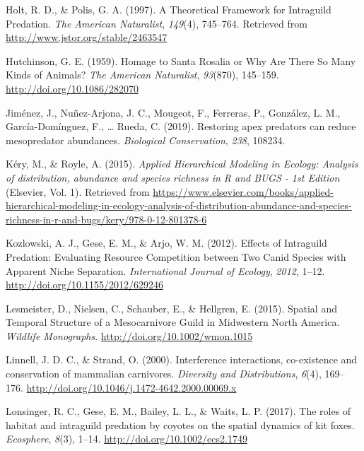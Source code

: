 \documentclass[12pt,twoside]{reedthesis}
\begin{document}
\leavevmode\hypertarget{ref-holt_theoretical_1997}{}%
Holt, R. D., \& Polis, G. A. (1997). A Theoretical Framework for Intraguild Predation. \emph{The American Naturalist}, \emph{149}(4), 745--764. Retrieved from \url{http://www.jstor.org/stable/2463547}

\leavevmode\hypertarget{ref-hutchinson_homage_1959}{}%
Hutchinson, G. E. (1959). Homage to Santa Rosalia or Why Are There So Many Kinds of Animals? \emph{The American Naturalist}, \emph{93}(870), 145--159. \url{http://doi.org/10.1086/282070}

\leavevmode\hypertarget{ref-jimenez_restoring_2019}{}%
Jiménez, J., Nuñez-Arjona, J. C., Mougeot, F., Ferreras, P., González, L. M., García-Domínguez, F., \ldots{} Rueda, C. (2019). Restoring apex predators can reduce mesopredator abundances. \emph{Biological Conservation}, \emph{238}, 108234.

\leavevmode\hypertarget{ref-kery_applied_2015}{}%
Kéry, M., \& Royle, A. (2015). \emph{Applied Hierarchical Modeling in Ecology: Analysis of distribution, abundance and species richness in R and BUGS - 1st Edition} (Elsevier, Vol. 1). Retrieved from \url{https://www.elsevier.com/books/applied-hierarchical-modeling-in-ecology-analysis-of-distribution-abundance-and-species-richness-in-r-and-bugs/kery/978-0-12-801378-6}

\leavevmode\hypertarget{ref-kozlowski_effects_2012}{}%
Kozlowski, A. J., Gese, E. M., \& Arjo, W. M. (2012). Effects of Intraguild Predation: Evaluating Resource Competition between Two Canid Species with Apparent Niche Separation. \emph{International Journal of Ecology}, \emph{2012}, 1--12. \url{http://doi.org/10.1155/2012/629246}

\leavevmode\hypertarget{ref-lesmeister_spatial_2015}{}%
Lesmeister, D., Nielsen, C., Schauber, E., \& Hellgren, E. (2015). Spatial and Temporal Structure of a Mesocarnivore Guild in Midwestern North America. \emph{Wildlife Monographs}. \url{http://doi.org/10.1002/wmon.1015}

\leavevmode\hypertarget{ref-linnell_interference_2000}{}%
Linnell, J. D. C., \& Strand, O. (2000). Interference interactions, co-existence and conservation of mammalian carnivores. \emph{Diversity and Distributions}, \emph{6}(4), 169--176. \url{http://doi.org/10.1046/j.1472-4642.2000.00069.x}

\leavevmode\hypertarget{ref-lonsinger_roles_2017}{}%
Lonsinger, R. C., Gese, E. M., Bailey, L. L., \& Waits, L. P. (2017). The roles of habitat and intraguild predation by coyotes on the spatial dynamics of kit foxes. \emph{Ecosphere}, \emph{8}(3), 1--14. \url{http://doi.org/10.1002/ecs2.1749}
\end{document}
